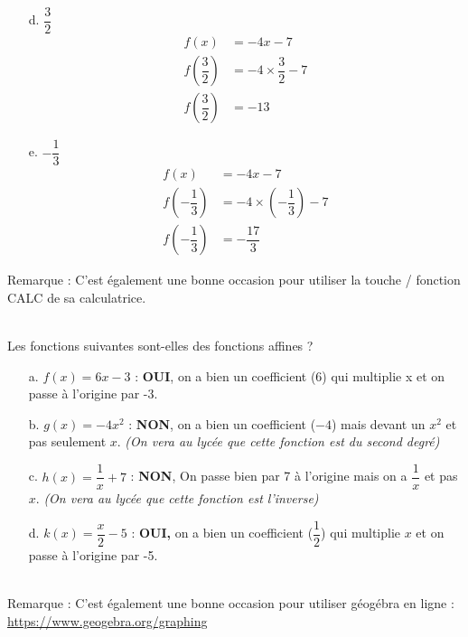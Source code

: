 \documentclass[11pt]{article}
\begin{document}
\begin{multicols}{2}
\begin{enumerate}
     \item[d.]   $\dfrac{3}{2}$
    \begin{align*}
        f(x) &= -4x - 7 \\
        f(\dfrac{3}{2}) &= -4 \times \dfrac{3}{2} - 7 \\
        f(\dfrac{3}{2}) &= -13
    \end{align*}\columnbreak

     \item[e.]   $- \dfrac{1}{3}$
    \begin{align*}
        f(x) &= -4x - 7 \\
        f(- \dfrac{1}{3}) &= -4 \times (- \dfrac{1}{3}) - 7 \\
        f(- \dfrac{1}{3}) &= - \dfrac{17}{3}
    \end{align*}            
\end{enumerate}
\end{multicols}
Remarque : C'est également une bonne occasion pour utiliser la touche / fonction CALC de sa calculatrice.


 \\
Les fonctions suivantes sont-elles des fonctions affines ?
\begin{enumerate}
    \item[a.] $f(x) = 6x - 3$ : \textbf{OUI}, on a bien un coefficient ($6$) qui multiplie x et on passe à l'origine par -3. 
    \item[b.] $g(x) = -4x^2$ : \textbf{NON}, on a bien un coefficient ($-4$) mais devant un $x^2$ et pas seulement $x$. \textit{(On vera au lycée que cette fonction est du second degré)}
    \item[c.] $h(x) = \dfrac{1}{x} + 7$ : \textbf{NON}, On passe bien par 7 à l'origine mais on a $\dfrac{1}{x}$ et pas $x$. \textit{(On vera au lycée que cette fonction est l'inverse)}
    \item[d.] $k(x) = \dfrac{x}{2} - 5$ : \textbf{OUI,} on a bien un coefficient ($\dfrac{1}{2}$) qui multiplie $x$ et on passe à l'origine par -5. 
\end{enumerate}

 \\
Remarque : C'est également une bonne occasion pour utiliser géogébra en ligne : \url{https://www.geogebra.org/graphing}\\
\end{document}
